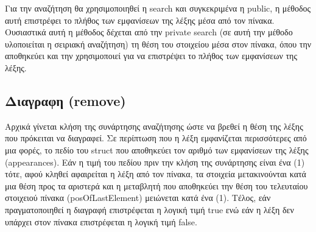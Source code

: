 Για την αναζήτηση θα χρησιμοποιηθεί η search και συγκεκριμένα η public, η μέθοδος αυτή επιστρέφει το πλήθος των εμφανίσεων της λέξης μέσα από τον πίνακα. Ουσιαστικά αυτή η μέθοδος δέχεται από την private search (σε αυτή την μέθοδο υλοποιείται η σειριακή αναζήτηση) τη θέση του στοιχείου μέσα στον πίνακα, όπου την αποθηκεύει και την χρησιμοποιεί για να επιστρέψει το πλήθος των εμφανίσεων της λέξης.

\subsection{Διαγραφη (remove)}

Αρχικά γίνεται κλήση της συνάρτησης αναζήτησης ώστε να βρεθεί η θέση της λέξης που πρόκειται να διαγραφεί. Σε περίπτωση που η λέξη εμφανίζεται περισσότερες από μια φορές, το πεδίο του struct που αποθηκεύει τον αριθμό των εμφανίσεων της λέξης (appearances). Εάν η τιμή του πεδίου πριν την κλήση της συνάρτησης είναι ένα (1) τότε, αφού κληθεί αφαιρείται η λέξη από τον πίνακα, τα στοιχεία μετακινούνται κατά μια θέση προς τα αριστερά και η μεταβλητή που αποθηκεύει την θέση του τελευταίου στοιχειού πίνακα (posOfLastElement) μειώνεται κατά ένα (1). Τέλος, εάν πραγματοποιηθεί η διαγραφή επιστρέφεται η λογική τιμή true ενώ εάν η λέξη δεν υπάρχει στον πίνακα επιστρέφεται η λογική τιμή false.
